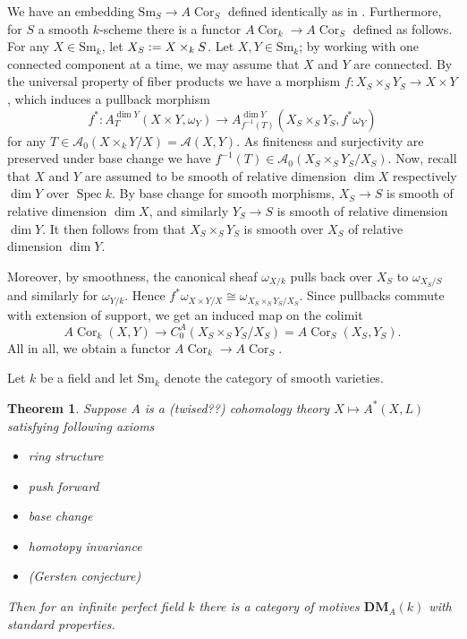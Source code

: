 \documentclass[a4paper, oneside, english,reqno]{amsart}
\theoremstyle{plain}
\newtheorem{theorem}{Theorem}[section]
\theoremstyle{definition}
\theoremstyle{remark}
\newcommand{\defeq}{\vcentcolon=}
\newcommand{\calA}{\mathcal{A}}
\newcommand{\Sm}{\mathrm{Sm}}
\newcommand{\DMA}{{\mathbf{DM}}_A}
\DeclareMathOperator{\Spec}{Spec}
\DeclareMathOperator{\Cor}{Cor}
\begin{document}
We have an embedding $\Sm_S\to A\Cor_S$ defined identically as in \cite{Calmes-Fasel}. Furthermore, for $S$ a smooth $k$-scheme there is a functor $A\Cor_k\to A\Cor_S$ defined as follows. For any $X\in\Sm_k$, let $X_S\defeq X\times_k S$. Let $X,Y\in\Sm_k$; by working with one connected component at a time, we may assume that $X$ and $Y$ are connected. By the universal property of fiber products we have a morphism $f\colon X_S\times_S Y_S\to X\times Y$, which induces a pullback morphism
\[
f^*\colon A_T^{\dim Y}(X\times Y,\omega_{Y})\to A_{f^{-1}(T)}^{\dim Y}(X_S\times_S Y_S,f^*\omega_{Y})
\]for any $T\in\calA_0(X\times_k Y/X)=\calA(X,Y)$. As finiteness and surjectivity are preserved under base change we have $f^{-1}(T)\in\calA_0(X_S\times_S Y_S/X_S)$. Now, recall that $X$ and $Y$ are assumed to be smooth of relative dimension $\dim X$ respectively $\dim Y$ over $\Spec k$. By base change for smooth morphisms, $X_S\to S$ is smooth of relative dimension $\dim X$, and similarly $Y_S\to S$ is smooth of relative dimension $\dim Y$. It then follows from \cite[III Proposition 10.1]{Hartshorne} that $X_S\times_S Y_S$ is smooth over $X_S$ of relative dimension $\dim Y$.

Moreover, by smoothness, the canonical sheaf $\omega_{X/k}$ pulls back over $X_S$ to $\omega_{X_S/S}$ and similarly for $\omega_{Y/k}$. Hence $f^*\omega_{X\times Y/X}\cong\omega_{X_S\times_S Y_S/X_S}$. Since pullbacks commute with extension of support, we get an induced map on the colimit
\[
A\Cor_k(X,Y)\to C^A_0(X_S\times_S Y_S/X_S)=A\Cor_S(X_S,Y_S).
\]
All in all, we obtain a functor $A\Cor_k\to A\Cor_S$.




\vspace{30pt}


Let $k$ be a field and let $\Sm_k$ denote the category of smooth varieties.

\begin{theorem}
Suppose $A$ is a (twised??) cohomology theory $X\mapsto A^*(X,L)$ satisfying following axioms
\begin{itemize}
\item ring structure
\item push forward
\item base change
\item homotopy invariance
\item (Gersten conjecture)
\end{itemize}
Then for an infinite perfect field $k$ there is a category of motives $\DMA(k)$ with standard properties.
\end{theorem}
\end{document}
